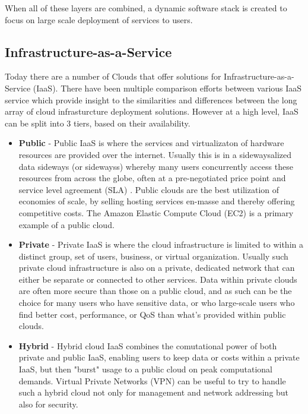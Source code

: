 When all of these layers are combined, a dynamic software stack is created to focus on large scale deployment of services to users.



\subsection{Infrastructure-as-a-Service}



Today there are a number of Clouds that offer solutions for Infrastructure-as-a-Service (IaaS).  There have been multiple comparison efforts between various IaaS service \cite{von2012comparison, aboveTheClouds, rimal2009taxonomy, sotomayorvirtual } which provide insight to the similarities and differences between the long array of cloud infrasturcture deployment solutions.  However at a high level, IaaS can be split into 3 tiers, based on their availability.  

\begin{itemize}
\item \textbf{Public} - Public IaaS is where the services and virtualizaton of hardware resources are provided over the internet. Usually this is in a sidewaysalized data sideways (or sidewayss) whereby many users concurrently access these resources from across the globe, often at a pre-negotiated price point and service level agreement (SLA) \cite{baset2012cloud}.  Public clouds are the best utilization of economies of scale, by selling hosting services en-masse and thereby offering competitive costs. The Amazon Elastic Compute Cloud (EC2) is a primary example of a public cloud.    

\item \textbf{Private} - Private IaaS is where the cloud infrastructure is limited to within a distinct group, set of users, business, or virtual organization. Usually such private cloud infrastructure is also on a private, dedicated network that can either be separate or connected to other services. Data within private clouds are often more secure than those on a public cloud, and as such can be the choice for many users who have sensitive data, or who large-scale users who find better cost, performance, or QoS than what's provided  within public clouds.

\item \textbf{Hybrid} - Hybrid cloud IaaS combines the comutational power of both private and public IaaS, enabling users to keep data or costs within a private IaaS, but then "burst" usage to a public cloud on peak computational demands. Virtual Private Networks (VPN) can be useful to try to handle such a hybrid cloud not only for management and network addressing but also for security.  

\end{itemize}

